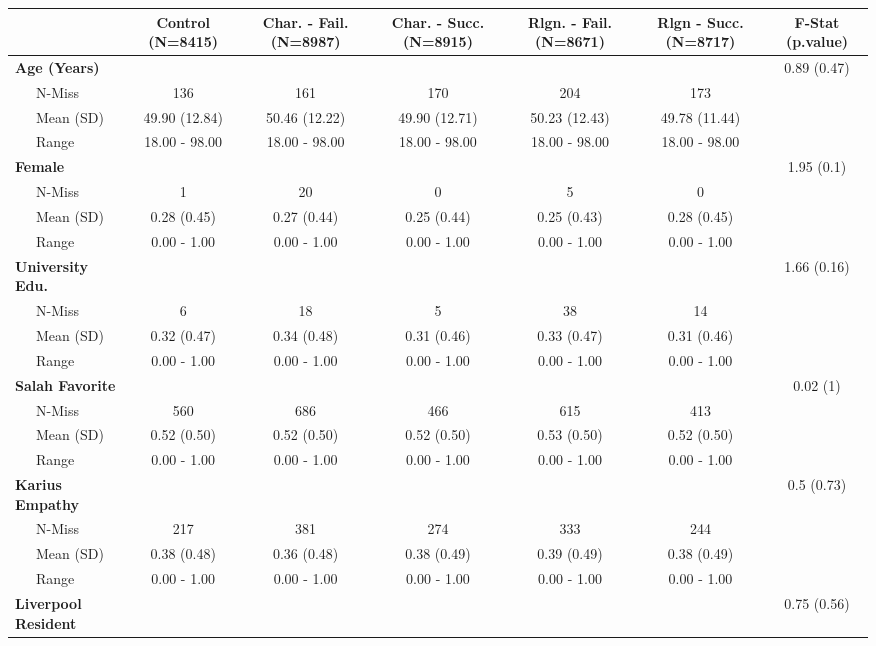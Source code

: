 
\begin{tabular}{l|c|c|c|c|c|c}
\hline
 & Control (N=8415) & Char. - Fail. (N=8987) & Char. - Succ. (N=8915) & Rlgn. - Fail. (N=8671) & Rlgn - Succ. (N=8717) & F-Stat (p.value)\\
\hline
\textbf{Age (Years)} &  &  &  &  &  & 0.89 (0.47)\\
\hline
~~~N-Miss & 136 & 161 & 170 & 204 & 173 & \\
\hline
~~~Mean (SD) & 49.90 (12.84) & 50.46 (12.22) & 49.90 (12.71) & 50.23 (12.43) & 49.78 (11.44) & \\
\hline
~~~Range & 18.00 - 98.00 & 18.00 - 98.00 & 18.00 - 98.00 & 18.00 - 98.00 & 18.00 - 98.00 & \\
\hline
\textbf{Female} &  &  &  &  &  & 1.95 (0.1)\\
\hline
~~~N-Miss & 1 & 20 & 0 & 5 & 0 & \\
\hline
~~~Mean (SD) & 0.28 (0.45) & 0.27 (0.44) & 0.25 (0.44) & 0.25 (0.43) & 0.28 (0.45) & \\
\hline
~~~Range & 0.00 - 1.00 & 0.00 - 1.00 & 0.00 - 1.00 & 0.00 - 1.00 & 0.00 - 1.00 & \\
\hline
\textbf{University Edu.} &  &  &  &  &  & 1.66 (0.16)\\
\hline
~~~N-Miss & 6 & 18 & 5 & 38 & 14 & \\
\hline
~~~Mean (SD) & 0.32 (0.47) & 0.34 (0.48) & 0.31 (0.46) & 0.33 (0.47) & 0.31 (0.46) & \\
\hline
~~~Range & 0.00 - 1.00 & 0.00 - 1.00 & 0.00 - 1.00 & 0.00 - 1.00 & 0.00 - 1.00 & \\
\hline
\textbf{Salah Favorite} &  &  &  &  &  & 0.02 (1)\\
\hline
~~~N-Miss & 560 & 686 & 466 & 615 & 413 & \\
\hline
~~~Mean (SD) & 0.52 (0.50) & 0.52 (0.50) & 0.52 (0.50) & 0.53 (0.50) & 0.52 (0.50) & \\
\hline
~~~Range & 0.00 - 1.00 & 0.00 - 1.00 & 0.00 - 1.00 & 0.00 - 1.00 & 0.00 - 1.00 & \\
\hline
\textbf{Karius Empathy} &  &  &  &  &  & 0.5 (0.73)\\
\hline
~~~N-Miss & 217 & 381 & 274 & 333 & 244 & \\
\hline
~~~Mean (SD) & 0.38 (0.48) & 0.36 (0.48) & 0.38 (0.49) & 0.39 (0.49) & 0.38 (0.49) & \\
\hline
~~~Range & 0.00 - 1.00 & 0.00 - 1.00 & 0.00 - 1.00 & 0.00 - 1.00 & 0.00 - 1.00 & \\
\hline
\textbf{Liverpool Resident} &  &  &  &  &  & 0.75 (0.56)\\

\end{tabular}

